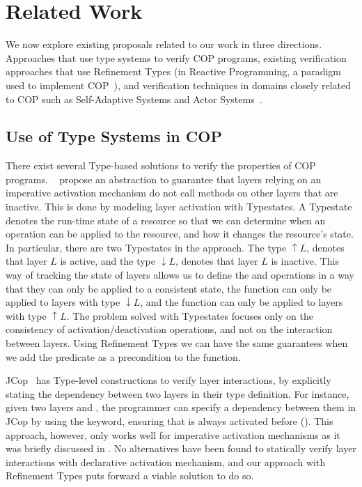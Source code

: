 
\section{Related Work}
\label{sec:related-work}

We now explore existing proposals related to our work in three directions. Approaches that use type 
systems to verify \ac{COP} programs, existing verification approaches that use Refinement Types
(\eg in Reactive Programming, a paradigm used to implement \ac{COP}~\cite{watanabe14,leger23}),
and verification techniques in domains closely related to \ac{COP} such as Self-Adaptive Systems
and Actor Systems~\cite{watanabe14}.


\subsection{Use of Type Systems in \acl{COP}}
\label{sec:types-cop}

There exist several Type-based solutions to verify the properties of \ac{COP} programs.
~\citet{aotani15} propose an abstraction to guarantee that layers relying on an imperative activation 
mechanism do not call methods on other layers that are inactive. This is done by modeling layer 
activation with Typestates. A Typestate denotes the run-time state of a resource so that we can 
determine when an operation can be applied to the resource, and how it changes the resource's state.
In particular, there are two Typestates in the approach. The type $\uparrow L$, denotes that layer 
$L$ is active, and the type $\downarrow L$, denotes that layer $L$ is inactive. This way of tracking the 
state of layers allows us to define the  and  operations in a way that 
they can only be applied to a consistent state, \ie the  function can only be applied to  
layers with type $\downarrow L$, and the  function can only be applied to layers with 
type $\uparrow L$.
The problem solved with Typestates focuses only on the consistency of activation/deactivation 
operations, and not on the interaction between layers. Using Refinement Types we can have the same 
guarantees when we add the  predicate as a precondition to the  function.

JCop~\cite{inoue14} has Type-level constructions to verify layer interactions, by explicitly stating the 
dependency between two layers in their type definition. For instance, given two layers  and 
, the programmer can specify a dependency between them in JCop by using the 
 keyword, ensuring that  is always activated before  
().
This approach, however, only works well for imperative activation mechanisms as it was briefly 
discussed in . No alternatives have been found to statically verify layer interactions with 
declarative activation mechanism, and our approach with Refinement Types puts forward a viable 
solution to do so.


